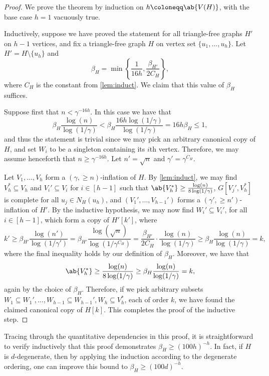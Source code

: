 \begin{proof}
    We prove the theorem by induction on $h\coloneqq\ab{V(H)}$, with the base case $h=1$ vacuously true.

    Inductively, suppose we have proved the statement for all triangle-free graphs $H'$ on $h-1$ vertices, and fix a triangle-free graph $H$ on vertex set $\{u_1,\dots,u_h\}$. Let $H' = H \setminus \{u_h\}$ and
    \[
    \beta_H = \min \left\{ \frac{1}{16h},  \frac{\beta_{H'}}{2C_H}\right\},
    \]
    where $C_H$ is the constant from \cref{lem:induct}.
    We claim that this value of $\beta_H$ suffices. 

    Suppose first that $n < \gamma^{-16h}$. In this case we have that
    \[
    \beta_H \frac{\log(n)}{\log(1/\gamma)} < \beta_H \frac{16h\log(1/\gamma)}{\log (1/\gamma)} =16h\beta_H \leq 1,
    \]
    and thus the statement is trivial since we may pick an arbitrary canonical copy of $H$, and set $W_i$ to be a singleton containing its $i$th vertex. Therefore, we may assume henceforth that $n \geq \gamma^{-16h}$. Let $n' = \sqrt n$ and $\gamma' = \gamma^{C_H}$.
    
    Let $V_1,\dots,V_h$ form a $(\gamma,\geq n)$-inflation of $H$. By \cref{lem:induct}, we may find $V_h^* \subseteq V_h$ and $V_i' \subseteq V_i$ for $i \in [h-1]$ such that $\ab{V_h^*} \geq  \frac{\log(n)}{8\log(1/\gamma)}$, $G[V_j', V_h^*]$ is complete for all $u_j \in N_H(u_h)$, and  $(V_1',\dots,V_{h-1}')$ forms a $(\gamma',\geq n')$-inflation of $H'$. By the inductive hypothesis, we may now find $W_i' \subseteq V_i'$, for all $i \in [h-1]$, which form a copy of $H'[k']$, where
    \[
    k' \geq \beta_{H'} \frac{\log(n')}{\log(1/\gamma')} = \beta_{H'} \frac{\log(\sqrt n)}{\log(1/\gamma^{C_H})} = \frac{\beta_{H'}}{2C_H} \cdot \frac{\log(n)}{\log(1/\gamma)} \geq \beta_H \frac{\log(n)}{\log(1/\gamma)}=k,
    \]
    where the final inequality holds by our definition of $\beta_H$. Moreover, we have that
    \[
    \ab{V_h^*} \geq  \frac{\log(n)}{8\log(1/\gamma)} \geq \beta_H \frac{\log(n)}{\log(1/\gamma)}=k,
    \]
    again by the choice of $\beta_H$. Therefore, if we pick arbitrary subsets $W_1 \subseteq W_1', \dots,W_{h-1} \subseteq W_{h-1}', W_h \subseteq V_h^*$, each of order $k$, we have found the claimed canonical copy of $H[k]$. This completes the proof of the inductive step.
\end{proof}
Tracing through the quantitative dependencies in this proof, it is straightforward to verify inductively that this proof demonstrates $\beta_H \geq (100 h)^{-h}$. In fact, if $H$ is $d$-degenerate, then by applying the induction according to the degenerate ordering, one can improve this bound to $\beta_H \geq (100d)^{-h}$.
